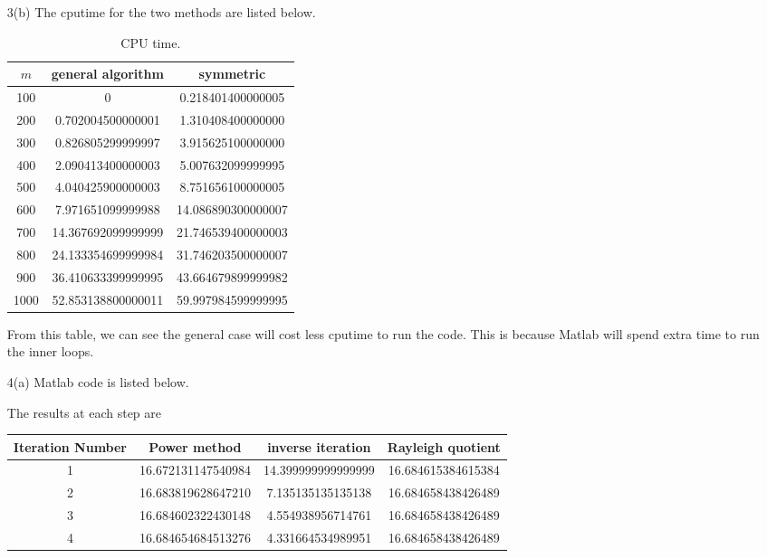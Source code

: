 \documentclass[letterpaper]{article}
\begin{document}
\begin{enumerate}
  \item[3(b)]
  The cputime for the two methods are listed below.
  \begin{table}[H]
    \centering
    \begin{tabular}{|c|c|c|}
    \hline
    $m$ & general algorithm & symmetric\\ \hline
    100 &            0      & 0.218401400000005\\
    200 & 0.702004500000001 &  1.310408400000000\\
    300 & 0.826805299999997 &  3.915625100000000\\
    400 & 2.090413400000003 &  5.007632099999995\\
    500 & 4.040425900000003 &  8.751656100000005\\
    600 & 7.971651099999988 & 14.086890300000007\\
    700 & 14.367692099999999&  21.746539400000003\\
    800 & 24.133354699999984&  31.746203500000007 \\   
    900 & 36.410633399999995&  43.664679899999982\\
    1000& 52.853138800000011&  59.997984599999995\\ \hline
  \end{tabular}\caption{CPU time.\label{tab:pb3_1}}
  \end{table}
  From this table, we can see the general case will cost less cputime to run the code. This is because Matlab will spend extra time to run the inner loops.
  \item[4(a)]\sol
Matlab code is listed below.
    
    The results at each step are\\[.2 cm]
    \begin{tabular}{|c|c|c|c|}
      \hline
      Iteration Number & Power method & inverse iteration & Rayleigh quotient\\\hline
       1 &  16.672131147540984 & 14.399999999999999 & 16.684615384615384\\
       2 &  16.683819628647210 &  7.135135135135138 & 16.684658438426489\\
       3 &  16.684602322430148 &  4.554938956714761 & 16.684658438426489\\
       4 &  16.684654684513276 &  4.331664534989951 & 16.684658438426489\\

\end{tabular}
\end{enumerate}
\end{document}
